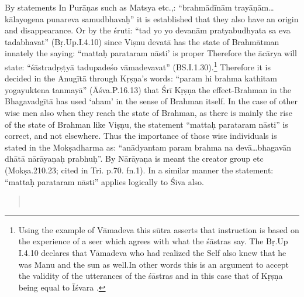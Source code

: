 By statements In Purāṇas such as Matsya etc.,: “brahmādīnām trayāṇām…kālayogena punareva samudbhavaḥ” it is established that they also have an origin and disappearance. Or by the śruti: “tad yo yo devanām pratyabudhyata sa eva tadabhavat” (Bṛ.Up.I.4.10)  since Viṣnu devatā has the state of Brahmātman innately the saying: “mattaḥ parataram nāsti’ is proper Therefore the ācārya will state: “śāstradṛṣṭyā tadupadeśo vāmadevavat” (BS.I.1.30).\footnote{Using the example of Vāmadeva this sūtra asserts that instruction is based on the experience of a seer which agrees with what the śāstras say. The Bṛ.Up I.4.10 declares that Vāmadeva who had realized the Self also knew that he was Manu and the sun as well.In other words this is an argument to accept the validity of the utterances of the śāstras and in this case that of Kṛṣṇa being equal to Īśvara .} Therefore it is decided in the Anugītā through Kṛṣṇa’s words: “param hi brahma kathitam yogayuktena tanmayā” (Āśva.P.16.13) that Śrī Kṛṣṇa the effect-Brahman in the Bhagavadgītā has used ‘aham’ in the sense of Brahman itself. In the case of other wise men also when they reach the state of Brahman, as there is mainly the rise of the state of Brahman like Viṣṇu, the statement “mattaḥ parataram nāsti” is correct, and not elsewhere. Thus the importance of those wise individuals is stated in the Mokṣadharma as: “anādyantam param brahma na devā…bhagavān dhātā nārāyaṇaḥ prabhuḥ”. By Nārāyaṇa is meant the creator group etc (Mokṣa.210.23; cited in Tri. p.70. fn.1). In a similar manner the statement: “mattaḥ parataram nāsti” applies logically to Śiva also.


\begin{verse}
\\
\end{verse}

